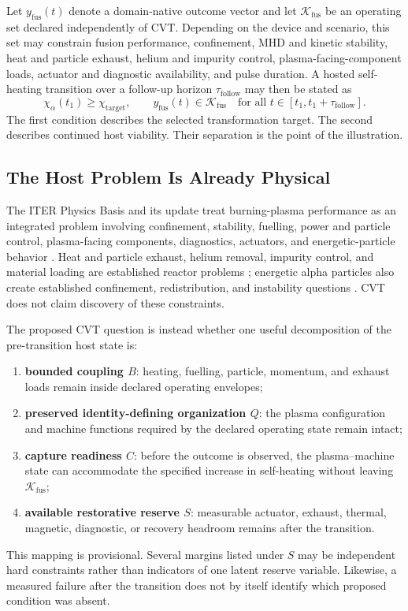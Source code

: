 Let \(y_{\mathrm{fus}}(t)\) denote a domain-native outcome vector and let \(\mathcal K_{\mathrm{fus}}\) be an operating set declared independently of CVT. Depending on the device and scenario, this set may constrain fusion performance, confinement, MHD and kinetic stability, heat and particle exhaust, helium and impurity control, plasma-facing-component loads, actuator and diagnostic availability, and pulse duration. A hosted self-heating transition over a follow-up horizon \(\tau_{\mathrm{follow}}\) may then be stated as
\begin{equation}
    \chi_{\alpha}(t_1)
    \geq
    \chi_{\mathrm{target}},
    \qquad
    y_{\mathrm{fus}}(t)
    \in
    \mathcal K_{\mathrm{fus}}
    \quad
    \text{for all }t\in[t_1,t_1+\tau_{\mathrm{follow}}].
    \label{eq:fusion-hosted-condition}
\end{equation}
The first condition describes the selected transformation target. The second describes continued host viability. Their separation is the point of the illustration.

\subsection{The Host Problem Is Already Physical}

The ITER Physics Basis and its update treat burning-plasma performance as an integrated problem involving confinement, stability, fuelling, power and particle control, plasma-facing components, diagnostics, actuators, and energetic-particle behavior \cite{iter1999,shimada2007}. Heat and particle exhaust, helium removal, impurity control, and material loading are established reactor problems \cite{loarte2007}; energetic alpha particles also create established confinement, redistribution, and instability questions \cite{fasoli2007}. CVT does not claim discovery of these constraints.

The proposed CVT question is instead whether one useful decomposition of the pre-transition host state is:
\begin{enumerate}[label=(\roman*)]
    \item \textbf{bounded coupling \(B\)}: heating, fuelling, particle, momentum, and exhaust loads remain inside declared operating envelopes;
    \item \textbf{preserved identity-defining organization \(Q\)}: the plasma configuration and machine functions required by the declared operating state remain intact;
    \item \textbf{capture readiness \(C\)}: before the outcome is observed, the plasma--machine state can accommodate the specified increase in self-heating without leaving \(\mathcal K_{\mathrm{fus}}\);
    \item \textbf{available restorative reserve \(S\)}: measurable actuator, exhaust, thermal, magnetic, diagnostic, or recovery headroom remains after the transition.
\end{enumerate}
This mapping is provisional. Several margins listed under \(S\) may be independent hard constraints rather than indicators of one latent reserve variable. Likewise, a measured failure after the transition does not by itself identify which proposed condition was absent.

